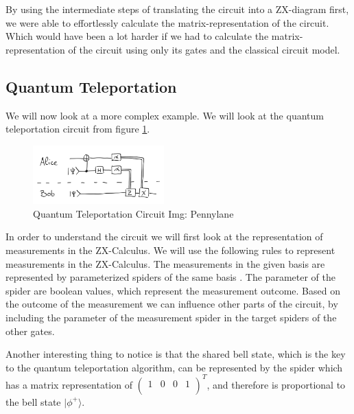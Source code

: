 By using the intermediate steps of translating the circuit into a ZX-diagram first, we were able to effortlessly calculate the matrix-representation of the circuit. Which would have been a lot harder if we had to calculate the matrix-representation of the circuit using only its gates and the classical circuit model.

\subsection{Quantum Teleportation}

We will now look at a more complex example. We will look at the quantum teleportation circuit from figure \ref{fig:teleportation-classic}.



\begin{figure}[h]
    \centering
    \includegraphics[width=0.45\textwidth]{images/teleportation-classic.png}
    \caption{Quantum Teleportation Circuit Img: Pennylane\cite{pennylane2023zx}}
    \label{fig:teleportation-classic}
\end{figure}

In order to understand the circuit we will first look at the representation of measurements in the ZX-Calculus. We will use the following rules to represent measurements in the ZX-Calculus. The measurements in the given basis are represented by parameterized spiders of the same basis \cite{vandewetering2020zxcalculus}. The parameter of the spider are boolean values, which represent the measurement outcome. Based on the outcome of the measurement we can influence other parts of the circuit, by including the parameter of the measurement spider in the target spiders of the other gates.

Another interesting thing to notice is that the shared bell state, which is the key to the quantum teleportation algorithm, can be represented by the spider
\zx{\zxNone{} \ar[d,C] \\[\zxWRow]    \zxNone{}} which has a matrix representation of $\begin{pmatrix}
        1 & 0 & 0 & 1 \\
    \end{pmatrix}^T$, and therefore is proportional to the bell state $|\phi^+\rangle$.


